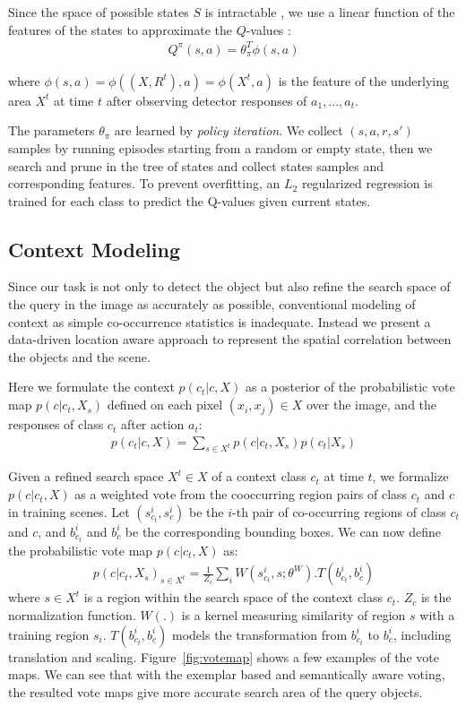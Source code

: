 Since the space of possible states $S$ is intractable , we use a linear function of the features of the states to approximate the $Q$-values :
\begin{eqnarray}
\label{eq:qvalue}
Q^{\pi}(s,a) = \theta_\pi^T \phi(s,a) 
\end{eqnarray}

where $\phi(s,a) = \phi((X, R^t),a) = \phi(X^t,a)$ is the feature of the underlying area $X^t$ at time $t$ after observing detector responses of $a_1,...,a_t$. 

The parameters $\theta_\pi$ are learned by \textit{policy iteration}. We collect $(s,a,r,s')$ samples by running episodes starting from a random or empty state, then we search and prune in the tree of states and collect states samples  and corresponding features. To prevent overfitting, an $L_2$ regularized regression is trained for each class to predict the Q-values given current states.

\subsection{Context Modeling}
\label{sec:context}
Since our task is not only to detect the object but also refine the search space of the query in the image as accurately as possible, conventional modeling of context as simple co-occurrence statistics is inadequate. Instead we present a data-driven location aware approach to represent the spatial correlation between the objects and the scene. 

Here we formulate the context $p(c_t|c,X)$ as a posterior of the probabilistic vote map $p(c|c_t,X_s)$ defined on each pixel $(x_i,x_j)\in X$ over the image, and the responses of class $c_t$ after action $a_t$:
\begin{eqnarray}
p(c_t|c,X) = \sum_{s\in X^t} p(c|c_t,X_s)p(c_t|X_s)
\end{eqnarray}

Given a refined search space $X^t\in X$ of a context class $c_t$ at time $t$, we formalize $p(c|c_t,X)$ as a weighted vote from the cooccurring region pairs of class $c_t$ and $c$ in training scenes. Let $(s_{c_t}^i, s_c^i)$ be the $i$-th pair of co-occurring regions of class $c_t$ and $c$, and $b_{c_t}^i$ and $b_c^i$ be the corresponding bounding boxes. We can now define the probabilistic vote map $p(c|c_t,X)$ as:
\begin{eqnarray}
\label{eq:votemap}
p(c|c_t,X_s)_{s\in X^t} = \frac{1}{Z_c}\sum_i W(s_{c_t}^i,s;\theta^W).T(b_{c_t}^i,b_c^i)
\end{eqnarray}
where $s\in X^t$ is a region within the search space of the context class $c_t$. $Z_c$ is the normalization function. $W(.)$ is a kernel measuring similarity of region $s$ with a training region $s_i$. $T(b_{c_t}^i,b_c^i)$ models the transformation from $b_{c_t}^i$ to $b_c^i$, including translation and scaling. Figure~\ref{fig:votemap} shows a few examples of the vote maps. We can see that with the exemplar based and semantically aware voting, the resulted vote maps give more accurate search area of the query objects.


